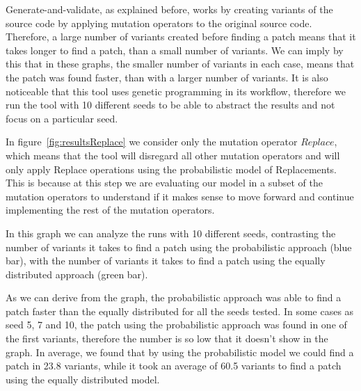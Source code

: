 \documentclass[conference]{IEEEtran}
\begin{document}
Generate-and-validate, as explained before, works by creating variants of the 
source code by applying mutation operators to the original source code. 
Therefore, a large number of variants created before finding a patch means that 
it takes longer to find a patch, than a small number of variants. We can imply by this 
that in these graphs, the smaller number of variants in each case, means that 
the patch was found faster, than with a larger number of variants. It is also 
noticeable that this tool uses genetic programming in its workflow, therefore we 
run the tool with 10 different seeds to be able to abstract the results 
and not focus on a particular seed.

In figure~\ref{fig:resultsReplace} we consider only the mutation operator 
$Replace$, which means that the tool will disregard all other mutation 
operators and will only apply Replace operations using the probabilistic model 
of Replacements. This is because at this step we are evaluating our model in a 
subset of the mutation operators to understand if it makes sense to move forward and 
continue implementing the rest of the mutation operators.

In this graph we can analyze the runs with 10 different seeds, contrasting the 
number of variants it takes to find a patch using the probabilistic approach 
(blue bar), with the number of variants it takes to find a patch using the 
equally distributed approach (green bar). 

As we can derive from the graph, the probabilistic approach was able to find a 
patch faster than the equally distributed for all the seeds tested. In some 
cases as seed 5, 7 and 10, the patch using the probabilistic approach was found 
in one of the first variants, therefore the number is so low that it doesn't 
show in the graph. In average, we found that by using the probabilistic model we 
could find a patch in 23.8 variants, while it took an average of 60.5 variants 
to find a patch using the equally distributed model.
\end{document}

